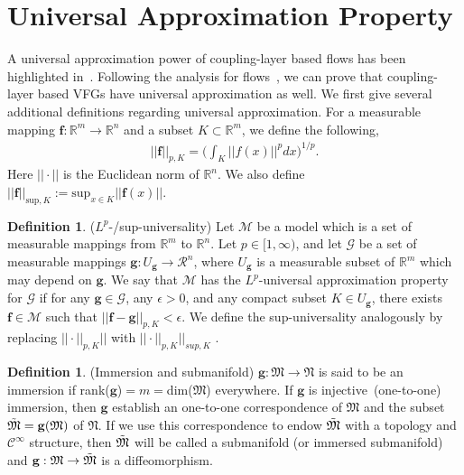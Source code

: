 \documentclass[sigconf, anonymous, review]{acmart}
\theoremstyle{plain}
\theoremstyle{definition}
\newtheorem{definition}[theorem]{Definition}
\theoremstyle{remark}
\begin{document}
\section{Universal Approximation Property}\label{sec:approx}

A universal approximation power of coupling-layer based flows has been highlighted in~\cite{Takeshi2020}. 
Following the analysis for flows~\cite{Takeshi2020}, we can prove that coupling-layer based VFGs have universal approximation as well.   We first  give several additional definitions regarding universal approximation. 
For a measurable mapping $\mathbf{f}: \mathbb{R}^m \rightarrow  \mathbb{R}^n$ and a subset $K \subset   \mathbb{R}^m $, we define the following,
\begin{align*} 
|| \mathbf{f}||_{p,K}= \bigg(\int_{K} ||f(x)||^p dx \bigg)^{1/p}.
\end{align*}
Here $||\cdot||$ is the Euclidean norm of $\mathbb{R}^n$. We also define $||\mathbf{f}||_{\text{sup},K} := \text{sup}_{x\in K} || \mathbf{f}(x)||$. 

\begin{definition}
($L^p$-/sup-universality) Let $\mathcal{M}$ be a model which is a set of measurable mappings from $\mathbb{R}^m$ to $\mathbb{R}^n$. Let $p\in [1, \infty)$, and let $\mathcal{G}$ be  a set of measurable mappings $\mathbf{g}: U_{\mathbf{g}} \rightarrow \mathcal{R}^n$, where $U_{\mathbf{g}}$ is a measurable subset of $\mathbb{R}^m$ which may depend on $\mathbf{g}$. We say that $\mathcal{M}$ has the $L^p$-universal approximation property for $\mathcal{G}$ if for any $\mathbf{g}\in \mathcal{G}$, any $\epsilon > 0$, and any compact subset $K \in U_{\mathbf{g}}$, there exists  $\mathbf{f} \in \mathcal{M}$ such that $|| \mathbf{f}-\mathbf{g}||_{p, K} < \epsilon$. We define the sup-universality analogously by replacing  $|| \cdot ||_{p, K}||$ with $|| \cdot ||_{p, K}||_{sup, K}$ .
\end{definition}


\begin{definition}
(Immersion and submanifold) $\mathbf{g}:\mathfrak{M}  \rightarrow \mathfrak{N} $ is said to be an immersion if rank($\mathbf{g}$)$=m=$dim($\mathfrak{M}$) everywhere. If $\mathbf{g}$ is injective~(one-to-one) immersion, then $\mathbf{g}$ establish an one-to-one correspondence of  $\mathfrak{M}$ and the subset $\Tilde{\mathfrak{M}} = \mathbf{g}(\mathfrak{M})$ of $\mathfrak{N}$. If we use this correspondence to endow $\Tilde{\mathfrak{M}}$ with a topology and $\mathcal{C}^{\infty}$ structure, then $\Tilde{\mathfrak{M}}$ will be called a submanifold (or immersed submanifold) and $\mathbf{g}:\mathfrak{M} \rightarrow \Tilde{\mathfrak{M}}$ is a diffeomorphism. 
\end{definition}
\end{document}

